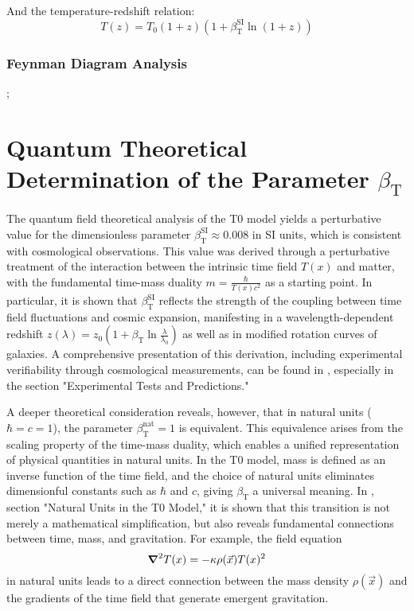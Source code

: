 \documentclass[12pt,a4paper]{article}
\newcommand{\Tfield}{T(x)}
\newcommand{\betaT}{\beta_{\text{T}}}
\newcommand{\vecx}{\vec{x}}
\begin{document}
	And the temperature-redshift relation:
	\begin{equation}
		T(z) = T_0 (1 + z) (1 + \betaT^{\text{SI}} \ln(1 + z))
	\end{equation}
	
	\subsubsection{Feynman Diagram Analysis}
	
	\begin{center}
		;
	\end{center}
	
	\section{Quantum Theoretical Determination of the Parameter \(\betaT\)}
	
	The quantum field theoretical analysis of the T0 model yields a perturbative value for the dimensionless parameter \(\betaT^{\text{SI}} \approx 0.008\) in SI units, which is consistent with cosmological observations. This value was derived through a perturbative treatment of the interaction between the intrinsic time field \(\Tfield\) and matter, with the fundamental time-mass duality \(m = \frac{\hbar}{\Tfield c^2}\) as a starting point. In particular, it is shown that \(\betaT^{\text{SI}}\) reflects the strength of the coupling between time field fluctuations and cosmic expansion, manifesting in a wavelength-dependent redshift \(z(\lambda) = z_0 \left(1 + \betaT \ln \frac{\lambda}{\lambda_0}\right)\) as well as in modified rotation curves of galaxies. A comprehensive presentation of this derivation, including experimental verifiability through cosmological measurements, can be found in \cite{pascher_emergente_gravitation_2025}, especially in the section "Experimental Tests and Predictions."
	
	A deeper theoretical consideration reveals, however, that in natural units (\(\hbar = c = 1\)), the parameter \(\betaT^{\text{nat}} = 1\) is equivalent. This equivalence arises from the scaling property of the time-mass duality, which enables a unified representation of physical quantities in natural units. In the T0 model, mass is defined as an inverse function of the time field, and the choice of natural units eliminates dimensionful constants such as \(\hbar\) and \(c\), giving \(\betaT\) a universal meaning. In \cite{pascher_emergente_gravitation_2025}, section "Natural Units in the T0 Model," it is shown that this transition is not merely a mathematical simplification, but also reveals fundamental connections between time, mass, and gravitation. For example, the field equation 
	\begin{equation}
		\grad^2 \Tfield = -\kappa \rho(\vecx) \Tfield^2
	\end{equation}
	in natural units leads to a direct connection between the mass density \(\rho(\vecx)\) and the gradients of the time field that generate emergent gravitation.
	
\end{document}
